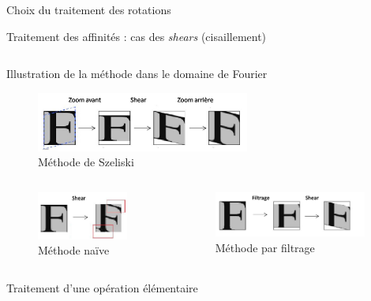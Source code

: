 \documentclass[c,12pt]{beamer}
\begin{document}
\begin{frame}{Choix du traitement des rotations}
\begin{frame}{Traitement des affinités : cas des \emph{shears} (cisaillement)}
\begin{columns}
\begin{column}{5cm}
\end{column}
\end{columns}
\end{frame}



\begin{frame}{Illustration de la méthode dans le domaine de Fourier }

\begin{figure}
\centering
\includegraphics[width=7cm]{fourier1.jpg}
\caption{Méthode de Szeliski}
\end{figure}

\begin{columns}
\begin{column}{4cm}

\begin{figure}
\centering
\includegraphics[width=3cm]{fourier2.jpg}
\caption{Méthode naïve}
\end{figure}


\end{column}

\begin{column}{6cm}

\begin{figure}
\centering
\includegraphics[width=5cm]{fourier3.jpg}
\caption{Méthode par filtrage}
\end{figure}


\end{column}
\end{columns}

\end{frame}

\begin{frame}{Traitement d'une opération élémentaire}



\end{frame}
\end{frame}
\end{document}
